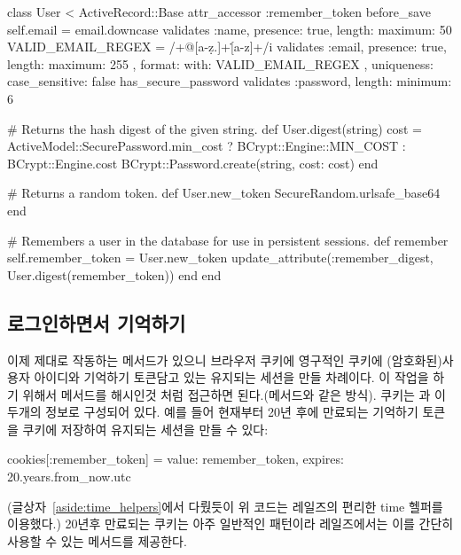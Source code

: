 {{\begin{codelisting} \label{code:user_model_remember}  

\begin{code} class User < ActiveRecord::Base attr_accessor :remember_token before_save { self.email = email.downcase } validates :name, presence: true, length: { maximum: 50 } VALID_EMAIL_REGEX = /\A[\w+\-.]+@[a-z\d\-.]+\.[a-z]+\z/i validates :email, presence: true, length: { maximum: 255 }, format: { with: VALID_EMAIL_REGEX }, uniqueness: { case_sensitive: false } has_secure_password validates :password, length: { minimum: 6 } 

# Returns the hash digest of the given string. def User.digest(string) cost = ActiveModel::SecurePassword.min_cost ? BCrypt::Engine::MIN_COST : BCrypt::Engine.cost BCrypt::Password.create(string, cost: cost) end 

# Returns a random token. def User.new_token SecureRandom.urlsafe_base64 end 

# Remembers a user in the database for use in persistent sessions. def remember self.remember_token = User.new_token update_attribute(:remember_digest, User.digest(remember_token)) end end \end{code} \end{codelisting} 

\subsection{로그인하면서 기억하기} \label{sec:login_with_remembering} 

이제 제대로 작동하는  메서드가 있으니 브라우저 쿠키에 영구적인 쿠키에 (암호화된)사용자 아이디와  기억하기 토큰담고 있는 유지되는 세션을 만들 차례이다. 이 작업을 하기 위해서  메서드를 해시인것 처럼 접근하면 된다.(메서드와 같은 방식). 쿠키는 과  이 두개의 정보로 구성되어 있다. 예를 들어 현재부터 20년 후에 만료되는 기억하기 토큰을 쿠키에 저장하여 유지되는 세션을 만들 수 있다: 

\begin{code} cookies[:remember_token] = { value: remember_token, expires: 20.years.from_now.utc } \end{code} 

\noindent (글상자~\ref{aside:time_helpers}에서 다뤘듯이 위 코드는 레일즈의 편리한 time 헬퍼를 이용했다.) 20년후 만료되는 쿠키는 아주 일반적인 패턴이라 레일즈에서는 이를 간단히 사용할 수 있는  메서드를 제공한다. 

}}
